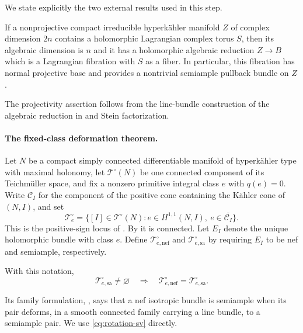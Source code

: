 We state explicitly the two external results used in this step.

\begin{theorem}
\label{thm:nonprojective-torus}
If a nonprojective compact irreducible hyperk\"ahler manifold $Z$ of
complex dimension $2n$ contains a holomorphic Lagrangian complex
torus $S$, then its algebraic dimension is $n$ and it has a
holomorphic algebraic reduction $Z\to B$ which is a Lagrangian
fibration with $S$ as a fiber.  In particular, this fibration has
normal projective base and provides a nontrivial semiample
pullback bundle on $Z$.
\end{theorem}
The projectivity assertion follows from the line-bundle construction
of the algebraic reduction in \cite[Section~4.2]{GLR} and Stein
factorization.

\paragraph{The fixed-class deformation theorem.}
Let $N$ be a compact simply connected differentiable manifold
of hyperk\"ahler type with maximal holonomy, let
$\mathcal T^\circ(N)$ be one connected component of its
Teichm\"uller space, and fix a nonzero primitive integral class
$e$ with $q(e)=0$.  Write $\mathcal C_I$ for the component of
the positive cone containing the K\"ahler cone of $(N,I)$, and set
\[
 \mathcal T^\circ_e
 =\{[I]\in\mathcal T^\circ(N):
       e\in H^{1,1}(N,I),\ e\in\overline{\mathcal C_I}\}.
\]
This is the positive-sign locus of
\cite[Definition~2.6]{SV}.  By \cite[Proposition~2.7]{SV} it is
connected.  Let $E_I$ denote the unique holomorphic bundle with
class $e$.  Define $\mathcal T^\circ_{e,\mathrm{nef}}$ and
$\mathcal T^\circ_{e,\mathrm{sa}}$ by requiring $E_I$ to be nef
and semiample, respectively.

\begin{theorem}
\label{thm:fixed-class}
With this notation,
\begin{equation}
 \mathcal T^\circ_{e,\mathrm{sa}}\ne\varnothing
 \quad\Longrightarrow\quad
 \mathcal T^\circ_{e,\mathrm{nef}}
      =\mathcal T^\circ_{e,\mathrm{sa}}.
\label{eq:rotation-sv}
\end{equation}
\end{theorem}
Its family formulation, \cite[Theorem~3.8]{SV}, says that a nef
isotropic bundle is semiample when its pair deforms, in a smooth
connected family carrying a line bundle, to a semiample pair.
We use \eqref{eq:rotation-sv} directly.

